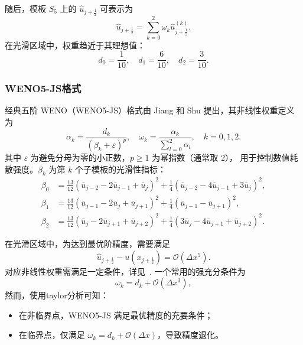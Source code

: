 \documentclass[12pt,a4paper]{article}
\numberwithin{equation}{section}    %
\begin{document}
随后，模板 $S_5$ 上的 $\hat{u}_{j+\frac{1}{2}}$ 可表示为
\begin{equation}
\hat{u}_{j+\frac{1}{2}} = \sum_{k=0}^{2} \omega_k \hat{u}^{(k)}_{j+\frac{1}{2}}.
\end{equation}
在光滑区域中，权重趋近于其理想值：
\begin{equation}
d_0 = \frac{1}{10},\quad d_1 = \frac{6}{10},\quad d_2 = \frac{3}{10}.
\end{equation}

\subsubsection{WENO5-JS格式}

经典五阶 WENO（WENO5-JS）格式由 Jiang 和 Shu 提出，其非线性权重定义为
\begin{equation}
\alpha_k = \frac{d_k}{(\beta_k+\varepsilon)^p},\quad
\omega_k = \frac{\alpha_k}{\sum_{l=0}^2 \alpha_l},\quad k=0,1,2.
\end{equation}
其中 $\varepsilon$ 为避免分母为零的小正数，$p\ge 1$ 为幂指数（通常取 $2$），
用于控制数值耗散强度。$\beta_k$ 为第 $k$ 个子模板的光滑性指标：
\begin{equation}
\begin{aligned}
\beta_0 &= \frac{13}{12}(\bar{u}_{j-2}-2\bar{u}_{j-1}+\bar{u}_j)^2
+ \frac{1}{4}(\bar{u}_{j-2}-4\bar{u}_{j-1}+3\bar{u}_j)^2,\\
\beta_1 &= \frac{13}{12}(\bar{u}_{j-1}-2\bar{u}_j+\bar{u}_{j+1})^2
+ \frac{1}{4}(\bar{u}_{j-1}-\bar{u}_{j+1})^2,\\
\beta_2 &= \frac{13}{12}(\bar{u}_j-2\bar{u}_{j+1}+\bar{u}_{j+2})^2
+ \frac{1}{4}(3\bar{u}_j-4\bar{u}_{j+1}+\bar{u}_{j+2})^2.
\end{aligned}
\end{equation}

在光滑区域中，为达到最优阶精度，需要满足
\begin{equation}
    \hat{u}_{j+\frac{1}{2}} - u(x_{j+\frac{1}{2}}) = \mathcal{O}(\Delta x^5).
\end{equation}
对应非线性权重需满足一定条件，详见~\cite{borges2008improved}. 一个常用的强充分条件为
\begin{equation}
    \omega_k = d_k + \mathcal{O}(\Delta x^3),
\end{equation}
然而，使用taylor分析可知：
\begin{itemize}
\item 在非临界点，WENO5-JS 满足最优精度的充要条件；
\item 在临界点，仅满足 $\omega_k = d_k + \mathcal{O}(\Delta x)$，导致精度退化。
\end{itemize}
\end{document}
